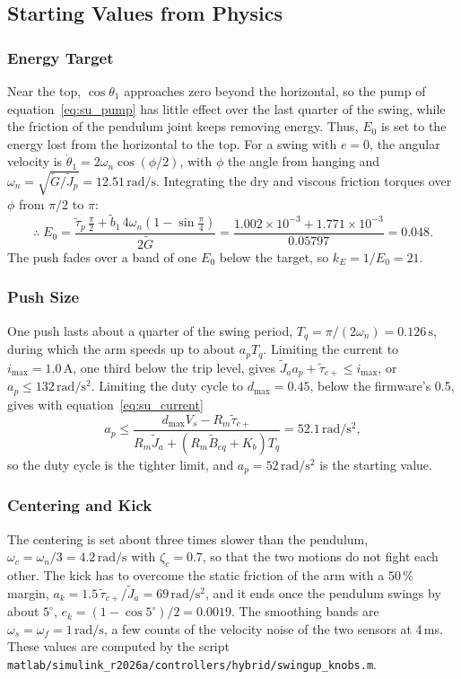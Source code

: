 \documentclass[a4paper,11pt]{article}
\begin{document}
\subsection{Starting Values from Physics}
\label{sec:su_physics}
\subsubsection{Energy Target}
Near the top, $\cos\theta_1$ approaches zero beyond the horizontal, so the pump of equation~\ref{eq:su_pump} has little effect over the last quarter of the swing, while the friction of the pendulum joint keeps removing energy. Thus, $E_0$ is set to the energy lost from the horizontal to the top. For a swing with $e = 0$, the angular velocity is $\dot\theta_1 = 2\omega_n \cos(\phi/2)$, with $\phi$ the angle from hanging and $\omega_n = \sqrt{\tilde G/\tilde J_p} = 12.51\,\mathrm{rad/s}$. Integrating the dry and viscous friction torques over $\phi$ from $\pi/2$ to $\pi$:
\begin{equation}
  \therefore\; E_0 = \frac{\tilde\tau_p\, \frac{\pi}{2} + \tilde b_1\, 4\omega_n \left(1 - \sin\frac{\pi}{4}\right)}{2\tilde G} = \frac{1.002\times10^{-3} + 1.771\times10^{-3}}{0.05797} = 0.048 .
  \label{eq:su_E0}
\end{equation}
The push fades over a band of one $E_0$ below the target, so $k_E = 1/E_0 = 21$.

\subsubsection{Push Size}
One push lasts about a quarter of the swing period, $T_q = \pi/(2\omega_n) = 0.126\,\mathrm{s}$, during which the arm speeds up to about $a_p T_q$. Limiting the current to $i_{\max} = 1.0\,\mathrm{A}$, one third below the trip level, gives $\tilde J_a a_p + \tilde\tau_{c+} \le i_{\max}$, or $a_p \le 132\,\mathrm{rad/s^2}$. Limiting the duty cycle to $d_{\max} = 0.45$, below the firmware's 0.5, gives with equation~\ref{eq:su_current}
\begin{equation}
  a_p \le \frac{d_{\max} V_s - R_m \tilde\tau_{c+}}{R_m \tilde J_a + \left(R_m \tilde B_{eq} + K_b\right) T_q} = 52.1\,\mathrm{rad/s^2},
\end{equation}
so the duty cycle is the tighter limit, and $a_p = 52\,\mathrm{rad/s^2}$ is the starting value.

\subsubsection{Centering and Kick}
The centering is set about three times slower than the pendulum, $\omega_c = \omega_n/3 = 4.2\,\mathrm{rad/s}$ with $\zeta_c = 0.7$, so that the two motions do not fight each other. The kick has to overcome the static friction of the arm with a 50\,\% margin, $a_k = 1.5\,\tilde\tau_{c+}/\tilde J_a = 69\,\mathrm{rad/s^2}$, and it ends once the pendulum swings by about $5^\circ$, $e_k = (1 - \cos 5^\circ)/2 = 0.0019$. The smoothing bands are $\omega_s = \omega_f = 1\,\mathrm{rad/s}$, a few counts of the velocity noise of the two sensors at 4\,ms. These values are computed by the script \nolinkurl{matlab/simulink_r2026a/controllers/hybrid/swingup_knobs.m}.
\end{document}
